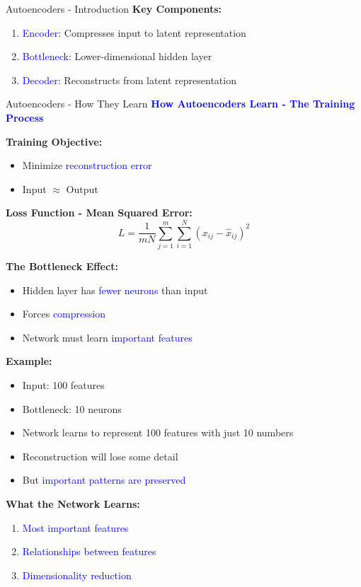 \documentclass[8pt]{beamer}
\begin{document}
\begin{frame}{Autoencoders - Introduction}
		\textbf{Key Components:}
		\begin{enumerate}
			\item \textcolor{blue}{Encoder}: Compresses input to latent representation
			\item \textcolor{blue}{Bottleneck}: Lower-dimensional hidden layer
			\item \textcolor{blue}{Decoder}: Reconstructs from latent representation
		\end{enumerate}
	\end{frame}
	
	\begin{frame}{Autoencoders - How They Learn}
		\fontsize{6.5}{7.5}\selectfont
		\textcolor{blue}{\textbf{How Autoencoders Learn - The Training Process}}
		
		\textbf{Training Objective:}
		\begin{itemize}
			\item Minimize \textcolor{blue}{reconstruction error}
			\item Input $\approx$ Output
		\end{itemize}
		
		\textbf{Loss Function - Mean Squared Error:}
		\[
		L = \frac{1}{mN} \sum_{j=1}^m \sum_{i=1}^N (x_{ij} - \hat{x}_{ij})^2
		\]
		
		\textbf{The Bottleneck Effect:}
		\begin{itemize}
			\item Hidden layer has \textcolor{blue}{fewer neurons} than input
			\item Forces \textcolor{blue}{compression}
			\item Network must learn \textcolor{blue}{important features}
		\end{itemize}
		
		\textbf{Example:}
		\begin{itemize}
			\item Input: 100 features
			\item Bottleneck: 10 neurons
			\item Network learns to represent 100 features with just 10 numbers
			\item Reconstruction will lose some detail
			\item But \textcolor{blue}{important patterns are preserved}
		\end{itemize}
		
		\textbf{What the Network Learns:}
		\begin{enumerate}
			\item \textcolor{blue}{Most important features}
			\item \textcolor{blue}{Relationships between features}
			\item \textcolor{blue}{Dimensionality reduction}
		\end{enumerate}
	\end{frame}
	
\end{document}

